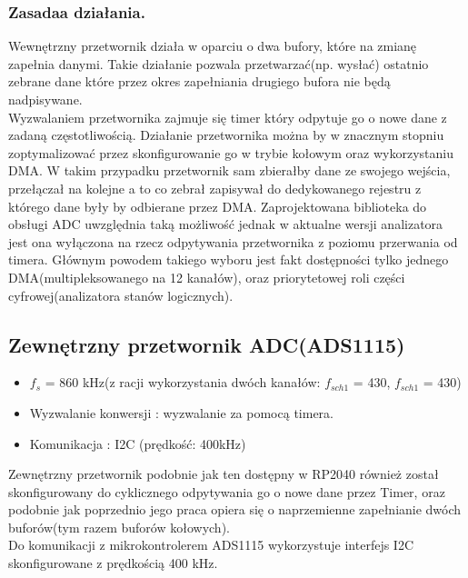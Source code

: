 \subsubsection{Zasadaa działania.}
Wewnętrzny przetwornik działa w oparciu o dwa bufory, które na zmianę zapełnia danymi. Takie 
działanie pozwala przetwarzać(np. wysłać) ostatnio zebrane dane które przez okres 
zapełniania drugiego bufora nie będą nadpisywane.\\
\indent Wyzwalaniem przetwornika zajmuje się timer który odpytuje go o nowe dane z zadaną częstotliwością.
Działanie przetwornika można by w znacznym stopniu zoptymalizować przez skonfigurowanie go w 
trybie kołowym oraz wykorzystaniu DMA. W takim przypadku przetwornik sam zbierałby dane ze swojego
wejścia, przełączał na kolejne a to co zebrał zapisywał do dedykowanego rejestru z którego dane
były by odbierane przez DMA. Zaprojektowana biblioteka do obsługi ADC uwzględnia taką możliwość
jednak w aktualne wersji analizatora jest ona wyłączona na rzecz odpytywania przetwornika z poziomu
przerwania od timera. Głównym powodem takiego wyboru jest fakt dostępności tylko jednego 
DMA(multipleksowanego na 12 kanałów), oraz priorytetowej roli części cyfrowej(analizatora stanów
logicznych).


\subsection{Zewnętrzny przetwornik ADC(ADS1115)}
\begin{itemize}
    \item $f_{s}$ = 860 kHz(z racji wykorzystania dwóch kanałów: $f_{sch1}$ = 430, $f_{sch1}$ = 430)
    \item Wyzwalanie konwersji : wyzwalanie za pomocą timera. 
    \item Komunikacja : I2C (prędkość: 400kHz)
\end{itemize}

\indent Zewnętrzny przetwornik podobnie jak ten dostępny w RP2040 również został skonfigurowany do cyklicznego 
odpytywania go o nowe dane przez Timer, oraz podobnie jak poprzednio jego praca opiera się o 
naprzemienne zapełnianie dwóch buforów(tym razem buforów kołowych). \\
\indent Do komunikacji z mikrokontrolerem ADS1115 wykorzystuje interfejs I2C skonfigurowane
z prędkością 400 kHz.

